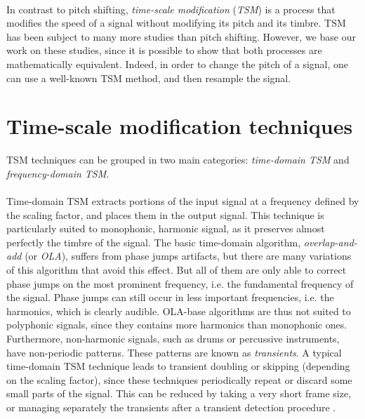 \documentclass[letterpaper]{article}
\theoremstyle{definition}
\theoremstyle{remark}
\begin{document}
\paragraph{}
In contrast to pitch shifting, \emph{time-scale modification} (\emph{TSM}) is a
process that modifies the speed of a signal without modifying its pitch and its
timbre. TSM has been subject to many more studies than pitch shifting. However,
we base our work on these studies, since it is possible to show that both
processes are mathematically equivalent. Indeed, in order to change the pitch of
a signal, one can use a well-known TSM method, and then resample the signal.

\section{Time-scale modification techniques}
TSM techniques can be grouped in two main categories: \emph{time-domain TSM} and
\emph{frequency-domain TSM}.

\paragraph{}
Time-domain TSM extracts portions of the input signal at a frequency defined by
the scaling factor, and places them in the output signal. This technique is
particularly suited to monophonic, harmonic signal, as it preserves almost
perfectly the timbre of the signal. The basic time-domain algorithm,
\emph{overlap-and-add} (or \emph{OLA}), suffers from phase jumps artifacts, but
there are many variations of this algorithm that avoid this effect. But all of
them are only able to correct phase jumps on the most prominent frequency, i.e.
the fundamental frequency of the signal. Phase jumps can still occur in less
important frequencies, i.e. the harmonics, which is clearly audible. OLA-base
algorithms are thus not suited to polyphonic signals, since they contains more
harmonics than monophonic ones. Furthermore, non-harmonic signals, such as drums
or percussive instruments, have non-periodic patterns. These patterns are known
as \emph{transients}. A typical time-domain TSM technique leads to transient
doubling or skipping (depending on the scaling factor), since these techniques
periodically repeat or discard some small parts of the signal. This can be
reduced by taking a very short frame size, or managing separately the transients
after a transient detection procedure \citep{Grofit2008}.
\end{document}
